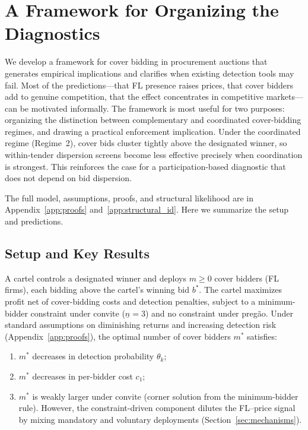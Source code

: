 
\section{A Framework for Organizing the Diagnostics}
\label{sec:structural}

We develop a framework for cover bidding in procurement auctions that
generates empirical implications and clarifies when existing detection
tools may fail. Most of the predictions---that FL presence raises
prices, that cover bidders add to genuine competition, that the effect
concentrates in competitive markets---can be motivated informally. The
framework is most useful for two purposes: organizing the distinction
between complementary and coordinated cover-bidding regimes, and
drawing a practical enforcement implication. Under the coordinated regime
(Regime~2), cover bids cluster tightly above the designated winner,
so within-tender dispersion screens become less effective precisely
when coordination is strongest. This reinforces the case for a
participation-based diagnostic that does not depend on bid dispersion.

The full model, assumptions, proofs, and structural likelihood are in
Appendix~\ref{app:proofs} and~\ref{app:structural_id}. Here we
summarize the setup and predictions.

\subsection{Setup and Key Results}

A cartel controls a designated winner and deploys $m \geq 0$ cover
bidders (FL firms), each bidding above the cartel's winning bid
$b^*$. The cartel maximizes profit net of cover-bidding costs and
detection penalties, subject to a minimum-bidder constraint under
convite ($\underline{n} = 3$) and no constraint under preg\~ao.
Under standard assumptions on diminishing returns and increasing
detection risk (Appendix~\ref{app:proofs}), the optimal number of
cover bidders $m^*$ satisfies:
\begin{enumerate}
  \item[(i)] $m^*$ decreases in detection probability $\theta_k$;
  \item[(ii)] $m^*$ decreases in per-bidder cost $c_1$;
  \item[(iii)] $m^*$ is weakly larger under convite (corner solution
    from the minimum-bidder rule). However, the constraint-driven
    component dilutes the FL--price signal by mixing mandatory and
    voluntary deployments (Section~\ref{sec:mechanisms}).
\end{enumerate}

